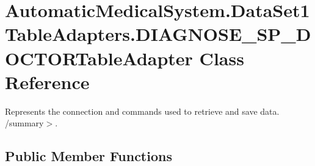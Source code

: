 \section{AutomaticMedicalSystem.DataSet1TableAdapters.DIAGNOSE\_\-SP\_\-DOCTORTableAdapter Class Reference}
\label{class_automatic_medical_system_1_1_data_set1_table_adapters_1_1_d_i_a_g_n_o_s_e___s_p___d_o_c_t_o_r_table_adapter}
Represents the connection and commands used to retrieve and save data. /summary$>$.  


\subsection*{Public Member Functions}

